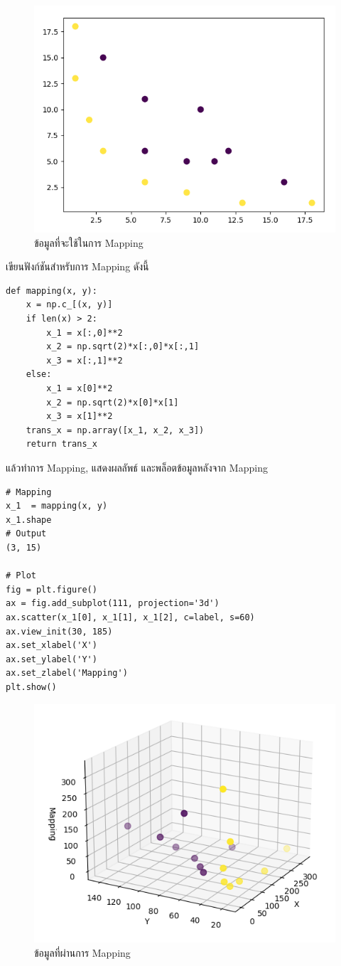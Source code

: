 \begin{figure}[H]
    \centering
    \includegraphics[width=0.7\linewidth]{fig/kernel_data.png}
    \caption{ข้อมูลที่จะใช้ในการ Mapping}
    \label{fig:kernel_data}
\end{figure}

\vspace{1em}

\noindent เขียนฟังก์ชันสำหรับการ Mapping ดังนี้

\begin{lstlisting}[style=MyPython]
def mapping(x, y):    
	x = np.c_[(x, y)]				
    if len(x) >	2:        
    	x_1 = x[:,0]**2        
        x_2 = np.sqrt(2)*x[:,0]*x[:,1]        
        x_3 = x[:,1]**2								
    else:            
    	x_1 = x[0]**2        
        x_2 = np.sqrt(2)*x[0]*x[1]        
        x_3 = x[1]**2			    
    trans_x = np.array([x_1, x_2, x_3])				
    return trans_x	
\end{lstlisting}

\vspace{1em}

\noindent แล้วทำการ Mapping, แสดงผลลัพธ์ และพล็อตข้อมูลหลังจาก Mapping

\begin{lstlisting}[style=MyPython]
# Mapping
x_1  = mapping(x, y)
x_1.shape
# Output
(3, 15)

# Plot
fig = plt.figure()
ax = fig.add_subplot(111, projection='3d')
ax.scatter(x_1[0], x_1[1], x_1[2], c=label, s=60)
ax.view_init(30, 185)
ax.set_xlabel('X')
ax.set_ylabel('Y')
ax.set_zlabel('Mapping')
plt.show()
\end{lstlisting}

\begin{figure}[H]
    \centering
    \includegraphics[width=0.65\linewidth]{fig/kernel_mapping.png}
    \caption{ข้อมูลที่ผ่านการ Mapping}
    \label{fig:kernel_mapping}
\end{figure}


